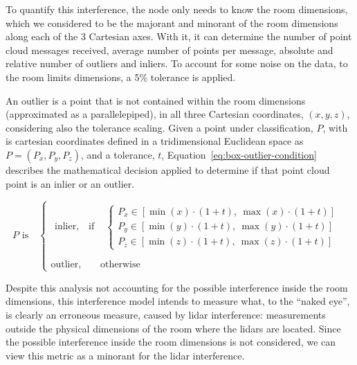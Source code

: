 To quantify this interference, the node only needs to know the room dimensions, which we considered to be the majorant and minorant of the room dimensions along each of the 3 Cartesian axes. With it, it can determine the number of point cloud messages received, average number of points per message, absolute and relative number of outliers and inliers. To account for some noise on the data, to the room limits dimensions, a 5\% tolerance is applied. 

An outlier is a point that is not contained within the room dimensions (approximated as a parallelepiped), in all three Cartesian coordinates, $(x, y, z)$, considering also the tolerance scaling. Given a point under classification, $P$, with is cartesian coordinates defined in a tridimensional Euclidean space as $P = (P_x, P_y, P_z)$, and a tolerance, $t$, Equation~\eqref{eq:box-outlier-condition} describes the mathematical decision applied to determine if that point cloud point is an inlier or an outlier.

\begin{equation}
\label{eq:box-outlier-condition}
P \text{\ is} \quad
\begin{cases}
	\begin{aligned}
		\text{inlier}, \quad \text{if\ } & 
		\begin{cases}
			P_x \in [\min(x) \cdot (1 + t),\ \max(x) \cdot (1 + t)] \\
			P_y \in [\min(y) \cdot (1+t),\ \max(y) \cdot (1 + t)]  \\
			P_z \in [\min(z) \cdot (1+t),\ \max(z) \cdot (1+t)] 
		\end{cases}	\\
	\end{aligned} \\
	\text{outlier}, \qquad \text{otherwise}
\end{cases}
\end{equation}

Despite this analysis not accounting for the possible interference inside the room dimensions, this interference model intends to measure what, to the ``naked eye'', is clearly an erroneous measure, caused by \ac{lidar} interference: measurements outside the physical dimensions of the room where the \acp{lidar} are located. Since the possible interference inside the room dimensions is not considered, we can view this metric as a minorant for the \ac{lidar} interference.


